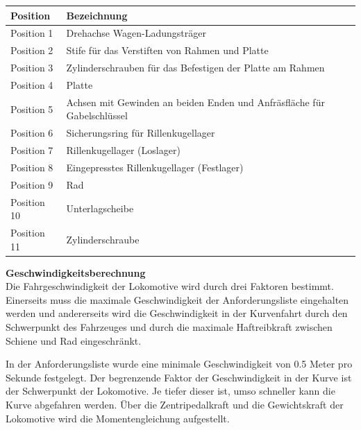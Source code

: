 \documentclass[../../main.tex]{subfiles}
\begin{document}
\begin{table}[H]
\begin{table}[H]
\begin{table}[H]
    \begin{table}[H] \centering
        \begin{tabular}{|l|l|}
        \hline
        \textbf{Position} & \textbf{Bezeichnung}\\
        \hline
        Position 1          & Drehachse Wagen-Ladungsträger\\
         \hline
        Position 2          & Stife für das Verstiften von Rahmen und Platte\\
        \hline
        Position 3          & Zylinderschrauben für das Befestigen der Platte am Rahmen\\
        \hline
        Position 4          & Platte\\
        \hline
        Position 5          & Achsen mit Gewinden an beiden Enden und Anfräsfläche für Gabelschlüssel\\
        \hline
        Position 6          & Sicherungsring für Rillenkugellager\\
        \hline
        Position 7          & Rillenkugellager (Loslager)\\
        \hline
        Position 8          & Eingepresstes Rillenkugellager (Festlager)\\
        \hline
        Position 9          & Rad\\
        \hline
        Position 10         & Unterlagscheibe\\
        \hline
        Position 11         & Zylinderschraube\\
        \hline
        \end{tabular}

    \textbf{Geschwindigkeitsberechnung}\\
    Die Fahrgeschwindigkeit der Lokomotive wird durch drei Faktoren bestimmt. Einerseits muss die maximale Geschwindigkeit der Anforderungsliste eingehalten werden und andererseits wird die Geschwindigkeit in der Kurvenfahrt durch den Schwerpunkt des Fahrzeuges und durch die maximale Haftreibkraft zwischen Schiene und Rad eingeschränkt.

    In der Anforderungsliste wurde eine minimale Geschwindigkeit von 0.5 Meter pro Sekunde festgelegt. Der begrenzende Faktor der Geschwindigkeit in der Kurve ist der Schwerpunkt der Lokomotive. Je tiefer dieser ist, umso schneller kann die Kurve abgefahren werden. Über die Zentripedalkraft und die Gewichtskraft der Lokomotive wird die Momentengleichung aufgestellt. 


\end{table}
\end{table}
\end{table}
\end{table}
\end{document}
